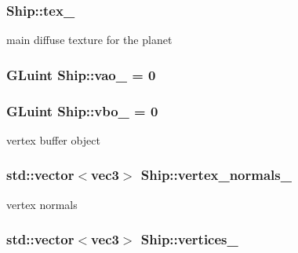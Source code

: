 \subsubsection[{\texorpdfstring{tex\+\_\+}{tex_}}]{ Ship\+::tex\+\_\+}\hypertarget{classShip_a4e83f38e706d9b6dde212a62f855ae4c}{}\label{classShip_a4e83f38e706d9b6dde212a62f855ae4c}


main diffuse texture for the planet 

\subsubsection[{\texorpdfstring{vao\+\_\+}{vao_}}]{\setlength{\rightskip}{0pt plus 5cm}G\+Luint Ship\+::vao\+\_\+ = 0\hspace{0.3cm}{\ttfamily [private]}}\hypertarget{classShip_a75ff9091b12184668e7fbd207ae54723}{}\label{classShip_a75ff9091b12184668e7fbd207ae54723}
\subsubsection[{\texorpdfstring{vbo\+\_\+}{vbo_}}]{\setlength{\rightskip}{0pt plus 5cm}G\+Luint Ship\+::vbo\+\_\+ = 0\hspace{0.3cm}{\ttfamily [private]}}\hypertarget{classShip_a5b0e65184158ac09af89f22b175f4638}{}\label{classShip_a5b0e65184158ac09af89f22b175f4638}


vertex buffer object 

\subsubsection[{\texorpdfstring{vertex\+\_\+normals\+\_\+}{vertex_normals_}}]{\setlength{\rightskip}{0pt plus 5cm}std\+::vector$<${\bf vec3}$>$ Ship\+::vertex\+\_\+normals\+\_\+\hspace{0.3cm}{\ttfamily [private]}}\hypertarget{classShip_a19f863867223a90ba40f177da69a740c}{}\label{classShip_a19f863867223a90ba40f177da69a740c}


vertex normals 

\subsubsection[{\texorpdfstring{vertices\+\_\+}{vertices_}}]{\setlength{\rightskip}{0pt plus 5cm}std\+::vector$<${\bf vec3}$>$ Ship\+::vertices\+\_\+\hspace{0.3cm}{\ttfamily [private]}}\hypertarget{classShip_aa6dc51c843eba9a8252c75a0450c0f9a}{}\label{classShip_aa6dc51c843eba9a8252c75a0450c0f9a}


